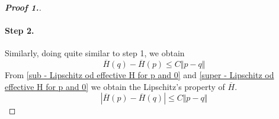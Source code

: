 \documentclass[12pt, oneside]{amsart}  	%
\begin{document}
\begin{proof}[\textbf{Proof 1.}]
\paragraph{\textbf{Step 2.}} Similarly, doing quite similar to step 1, we obtain
\begin{equation}\label{super - Lipschitz od effective H for p and 0}
\overline{H}(q) - \overline{H}(p) \leq C\Vert p-q\Vert
\end{equation}
From \eqref{sub - Lipschitz od effective H for p and 0} and \eqref{super - Lipschitz od effective H for p and 0} we obtain the Lipschitz's property of $\overline{H}$.
\begin{equation*}
|\overline{H}(p) - \overline{H}(q)|\leq C\Vert p-q\Vert
\end{equation*}
\vspace*{0.2cm}


\end{proof}
\end{document}
